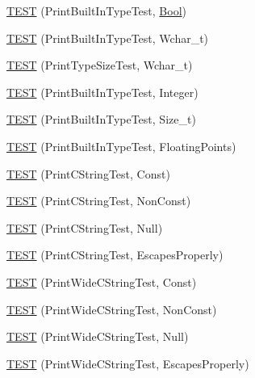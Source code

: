 \begin{DoxyCompactItemize}
\hyperlink{namespacetesting_1_1gtest__printers__test_a6f08c464dc0b8eb822368f552d4467ad}{T\+E\+S\+T} (Print\+Built\+In\+Type\+Test, \hyperlink{struct_bool}{Bool})
\item 
\hyperlink{namespacetesting_1_1gtest__printers__test_ab567ebd97eff0a4b9a20a5f5cb77d678}{T\+E\+S\+T} (Print\+Built\+In\+Type\+Test, Wchar\+\_\+t)
\item 
\hyperlink{namespacetesting_1_1gtest__printers__test_a705ec4c2886606a22194107397fceea6}{T\+E\+S\+T} (Print\+Type\+Size\+Test, Wchar\+\_\+t)
\item 
\hyperlink{namespacetesting_1_1gtest__printers__test_a278d53e99390c7b31ff531524fe5e86e}{T\+E\+S\+T} (Print\+Built\+In\+Type\+Test, Integer)
\item 
\hyperlink{namespacetesting_1_1gtest__printers__test_a991dc124d153742c3ca126b2fa9ccab5}{T\+E\+S\+T} (Print\+Built\+In\+Type\+Test, Size\+\_\+t)
\item 
\hyperlink{namespacetesting_1_1gtest__printers__test_acde0b28d177604ddb5e185d7b107f6f7}{T\+E\+S\+T} (Print\+Built\+In\+Type\+Test, Floating\+Points)
\item 
\hyperlink{namespacetesting_1_1gtest__printers__test_a6cd47b21ad8d9ac66ba57b5b6415a924}{T\+E\+S\+T} (Print\+C\+String\+Test, Const)
\item 
\hyperlink{namespacetesting_1_1gtest__printers__test_a89d9905fecee1b976c26d35498734dd4}{T\+E\+S\+T} (Print\+C\+String\+Test, Non\+Const)
\item 
\hyperlink{namespacetesting_1_1gtest__printers__test_ad29b97d58a4d1e5e8dd4d854f66b9e22}{T\+E\+S\+T} (Print\+C\+String\+Test, Null)
\item 
\hyperlink{namespacetesting_1_1gtest__printers__test_a140030b990011abab91d4c0b59f21edd}{T\+E\+S\+T} (Print\+C\+String\+Test, Escapes\+Properly)
\item 
\hyperlink{namespacetesting_1_1gtest__printers__test_a4caa1f81979cdc6f5ada95e01a4fae63}{T\+E\+S\+T} (Print\+Wide\+C\+String\+Test, Const)
\item 
\hyperlink{namespacetesting_1_1gtest__printers__test_a8812b5f088e13083ebb8a7e35fbcdae7}{T\+E\+S\+T} (Print\+Wide\+C\+String\+Test, Non\+Const)
\item 
\hyperlink{namespacetesting_1_1gtest__printers__test_acd1267d49d61ad53b2b8a88f68fca3a7}{T\+E\+S\+T} (Print\+Wide\+C\+String\+Test, Null)
\item 
\hyperlink{namespacetesting_1_1gtest__printers__test_aa80d6bb47e6bf997dacf0c75322d12cf}{T\+E\+S\+T} (Print\+Wide\+C\+String\+Test, Escapes\+Properly)

\end{DoxyCompactItemize}
